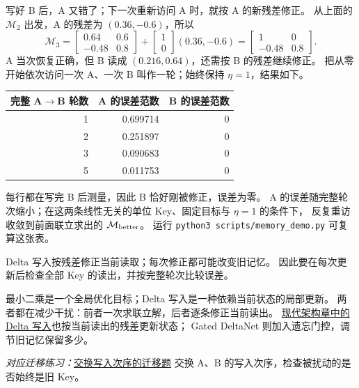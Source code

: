 写好 B 后，A 又错了；下一次重新访问 A 时，就按 A 的新残差修正。
从上面的 $\mathcal{M}_2$ 出发，A 的残差为 $(0.36,-0.6)$，所以
\[
\mathcal{M}_3
=\begin{bmatrix}0.64&0.6\\-0.48&0.8\end{bmatrix}
+\begin{bmatrix}1\\0\end{bmatrix}(0.36,-0.6)
=\begin{bmatrix}1&0\\-0.48&0.8\end{bmatrix}.
\]
A 当次恢复正确，但 B 读成 $(0.216,0.64)$，还需按 B 的残差继续修正。
把从零开始依次访问一次 A、一次 B 叫作一轮；始终保持 $\eta=1$，结果如下。
\begin{center}\small
{}
\begin{tabular}{@{}rrr@{}}\toprule
完整 A$\to$B 轮数 & A 的误差范数 & B 的误差范数\\\midrule
1 & 0.699714 & 0\\
2 & 0.251897 & 0\\
3 & 0.090683 & 0\\
5 & 0.011753 & 0\\\bottomrule
\end{tabular}
\end{center}
每行都在写完 B 后测量，因此 B 恰好刚被修正，误差为零。
A 的误差随完整轮次缩小；在这两条线性无关的单位 Key、固定目标与 $\eta=1$ 的条件下，
反复重访收敛到前面联立求出的 $\mathcal{M}_{\rm better}$。
运行 \texttt{python3 scripts/memory\_demo.py} 可复算这张表。

\begin{boundarybox}
Delta 写入按残差修正当前读取；每次修正都可能改变旧记忆。
因此要在每次更新后检查全部 Key 的读出，并按完整轮次比较误差。
\end{boundarybox}

\begin{idea}
最小二乘是一个全局优化目标；Delta 写入是一种依赖当前状态的局部更新。
两者都在减少干扰：前者一次求联立解，后者逐条修正当前读出。
\hyperref[sec:modern-delta-rule]{现代架构章中的 Delta 写入}也按当前读出的残差更新状态；
Gated DeltaNet 则加入遗忘门控，调节旧记忆保留多少。
\end{idea}

\noindent\emph{对应迁移练习：}\hyperref[exercise:delta-reverse]{交换写入次序的迁移题}
交换 A、B 的写入次序，检查被扰动的是否始终是旧 Key。

